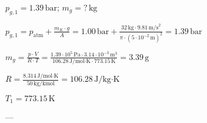 \( p_{g,1} = 1.39 \, \text{bar} \); \( m_g = ? \, \text{kg} \)  

\( p_{g,1} = p_{\text{atm}} + \frac{m_K \cdot g}{A} = 1.00 \, \text{bar} + \frac{32 \, \text{kg} \cdot 9.81 \, \text{m/s}^2}{\pi \cdot (5 \cdot 10^{-2} \, \text{m})^2} = 1.39 \, \text{bar} \)  

\( m_g = \frac{p \cdot V}{R \cdot T} = \frac{1.39 \cdot 10^5 \, \text{Pa} \cdot 3.14 \cdot 10^{-3} \, \text{m}^3}{106.28 \, \text{J/mol·K} \cdot 773.15 \, \text{K}} = 3.39 \, \text{g} \)  

\( R = \frac{8.314 \, \text{J/mol·K}}{50 \, \text{kg/kmol}} = 106.28 \, \text{J/kg·K} \)  

\( T_1 = 773.15 \, \text{K} \)  

---
